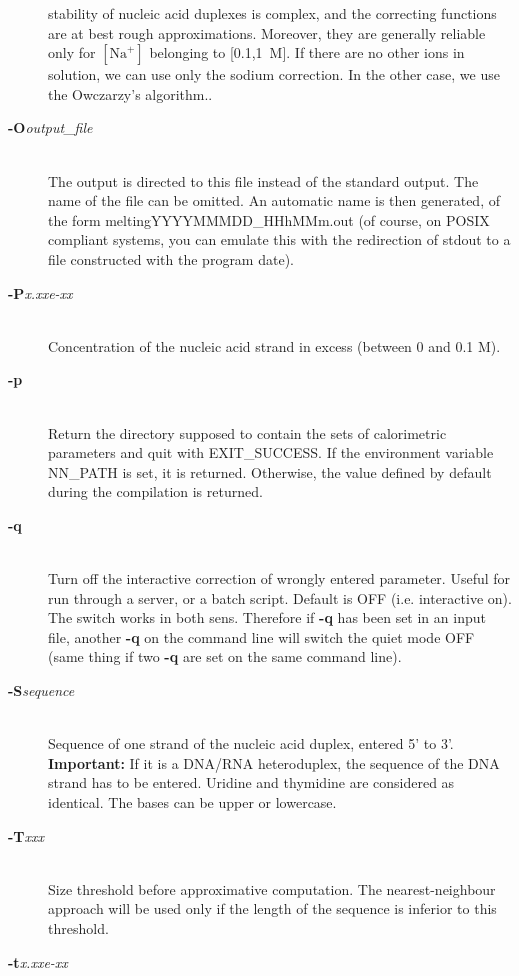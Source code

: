 \documentclass{article}
\begin{document}
\begin{description}
  stability of nucleic acid duplexes is complex, and the correcting functions
  are at best rough approximations. Moreover, they are generally reliable only
  for $[\mbox{Na}^+]$ belonging to [0.1,1~M]. If there are no other ions in 
  solution, we can use only the sodium correction. In the other case, we use the Owczarzy's 
  algorithm..
\item [\textbf{-O}\textit{output\_file}]\mbox{}\\ 
The output is directed to this file instead of the standard
output. The name of the file can be omitted. An automatic name is then
generated, of the form  meltingYYYYMMMDD\_HHhMMm.out (of course, 
on POSIX compliant systems, you  can emulate this with the redirection 
of stdout to a file constructed with the program date).  
\item [\textbf{-P}\textit{x.xxe-xx}]\mbox{}\\ 
Concentration of the nucleic acid strand in excess (between 0 and 0.1 M).
\item [\textbf{-p}]\mbox{}\\ 
Return the directory supposed to contain the sets of calorimetric parameters and quit with
EXIT\_SUCCESS. If the environment variable NN\_PATH is set, it is returned. Otherwise, the value
defined by default during the compilation is returned.
\item [\textbf{-q}  ]\mbox{}\\ 
Turn off the interactive correction of wrongly entered
parameter. Useful for run through a server, or a batch script. Default
is OFF (i.e. interactive on). The switch works in both sens. 
 Therefore if  \textbf{-q } has been set in an input file, another
 \textbf{-q } on the command line will switch the quiet mode OFF (same
 thing if two \textbf{-q } are set on the same command line).  
\item [\textbf{-S}\textit{sequence}  ]\mbox{}\\ 
Sequence of one strand of the nucleic 
acid duplex, entered 5' to 3'. \textbf{Important:} If it is a DNA/RNA  heteroduplex, 
the sequence of the DNA strand has to be entered.  
Uridine and thymidine are 
considered as identical. The bases can be upper or lowercase.
\item [\textbf{-T}\textit{xxx}  ]\mbox{}\\ 
Size threshold before approximative computation. The nearest-neighbour approach 
will be used only if the length of the sequence is inferior to this threshold.
\item [\textbf{-t}\textit{x.xxe-xx}  ]\mbox{}\\ 

\end{description}
\end{document}
